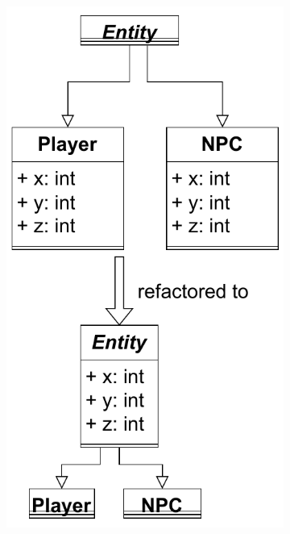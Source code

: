 \begin{figure}
    \begin{subfigure}[t]{0.4\columnwidth}
        \includegraphics[width=1\columnwidth]{figures/chapter2/alternative_refactorings_move_up.drawio.pdf}
        

\end{subfigure}
\end{figure}
